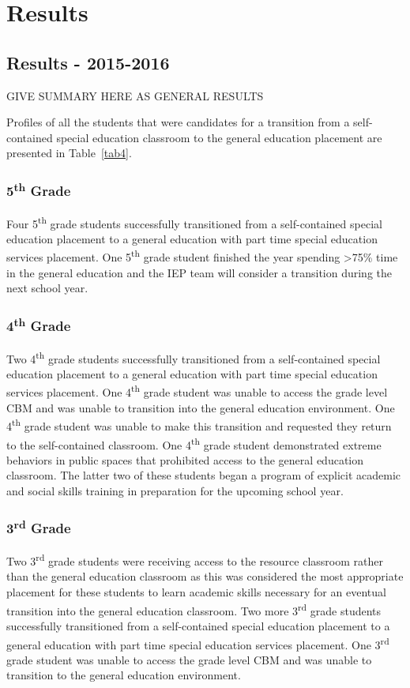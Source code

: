 \documentclass[twoside]{article}
\begin{document}
%
%
\section{Results}
\subsection{Results - 2015-2016}
GIVE SUMMARY HERE AS GENERAL RESULTS

Profiles of all the students that were candidates for a transition from a self-contained special education classroom to the general education placement are presented in Table~\ref{tab4}.

\subsubsection{5\textsuperscript{th} Grade}
Four 5\textsuperscript{th} grade students successfully transitioned from a self-contained special education placement to a general education with part time special education services placement. One 5\textsuperscript{th} grade student finished the year spending \textgreater75\% time in the general education and the IEP team will consider a transition during the next school year.

\subsubsection{4\textsuperscript{th} Grade}
Two 4\textsuperscript{th} grade students successfully transitioned from a self-contained special education placement to a general education with part time special education services placement. One 4\textsuperscript{th} grade student was unable to access the grade level CBM and was unable to transition into the general education environment. One 4\textsuperscript{th} grade student was unable to make this transition and requested they return to the self-contained classroom. One 4\textsuperscript{th} grade student demonstrated extreme behaviors in public spaces that prohibited access to the general education classroom. The latter two of these students began a program of explicit academic and social skills training in preparation for the upcoming school year.

\subsubsection{3\textsuperscript{rd} Grade}
Two 3\textsuperscript{rd} grade students were receiving access to the resource classroom rather than the general education classroom as this was considered the most appropriate placement for these students to learn academic skills necessary for an eventual transition into the general education classroom. Two more 3\textsuperscript{rd} grade students successfully transitioned from a self-contained special education placement to a general education with part time special education services placement. One 3\textsuperscript{rd} grade student was unable to access the grade level CBM and was unable to transition to the general education environment.
\end{document}
